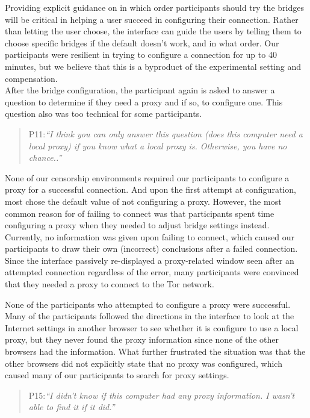 \documentclass{template}
\begin{document}
Providing explicit guidance on in which order participants should try the bridges will be critical in helping a user succeed in configuring their connection. Rather than letting the user choose, the interface can guide the users by telling them to choose specific bridges if the default doesn't work, and in what order. Our participants were resilient in trying to configure a connection for up to 40 minutes, but we believe that this is a byproduct of the experimental setting and compensation. \\

After the bridge configuration, the participant again is asked to answer a question to determine if they need a proxy and if so, to configure one. This question also was too technical for some participants.

\begin{quotation}
\noindent P11:\textit{``I think you can only answer this question (does this computer need a local proxy) if you know what a local proxy is. Otherwise, you have no chance..''}
\end{quotation}

None of our censorship environments required our participants to configure a proxy for a successful connection. And upon the first attempt at configuration, most chose the default value of not configuring a proxy.  However, the most common reason for of failing to connect was that participants spent time configuring a proxy when they needed to adjust  bridge settings instead. Currently, no information was given upon failing to connect, which caused our participants to draw their own (incorrect) conclusions after a failed connection. Since the interface passively re-displayed a proxy-related window seen after an attempted connection regardless of the error, many participants were convinced that they needed a proxy to connect to the Tor network.

None of the participants who attempted to configure a proxy were successful. Many of the participants followed the directions in the interface to look at the Internet settings in another browser to see whether it is configure to use a local proxy, but they never found the proxy information since none of the other browsers had the information. What further frustrated the situation was that the other browsers did not explicitly state that no proxy was configured, which caused many of our participants to search for proxy settings.

\begin{quotation}
\noindent P15:\textit{``I didn't know if this computer had any proxy information. I wasn't able to find it if it did.''}
\end{quotation}
\end{document}
